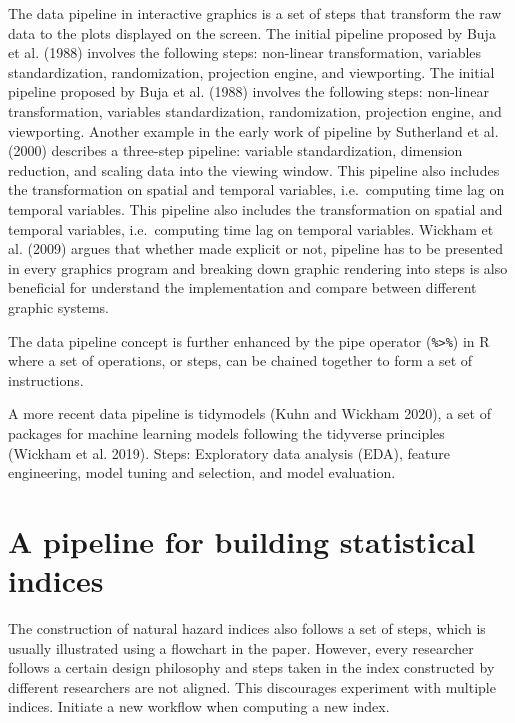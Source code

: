 \documentclass[
]{article}
\begin{document}
The data pipeline in interactive graphics is a set of steps that
transform the raw data to the plots displayed on the screen. The initial
pipeline proposed by Buja et al. (1988) involves the following steps:
non-linear transformation, variables standardization, randomization,
projection engine, and viewporting. The initial pipeline proposed by
Buja et al. (1988) involves the following steps: non-linear
transformation, variables standardization, randomization, projection
engine, and viewporting. Another example in the early work of pipeline
by Sutherland et al. (2000) describes a three-step pipeline: variable
standardization, dimension reduction, and scaling data into the viewing
window. This pipeline also includes the transformation on spatial and
temporal variables, i.e.~computing time lag on temporal variables. This
pipeline also includes the transformation on spatial and temporal
variables, i.e.~computing time lag on temporal variables. Wickham et al.
(2009) argues that whether made explicit or not, pipeline has to be
presented in every graphics program and breaking down graphic rendering
into steps is also beneficial for understand the implementation and
compare between different graphic systems.

The data pipeline concept is further enhanced by the pipe operator
(\texttt{\%\textgreater{}\%}) in R where a set of operations, or steps,
can be chained together to form a set of instructions.

A more recent data pipeline is tidymodels (Kuhn and Wickham 2020), a set
of packages for machine learning models following the tidyverse
principles (Wickham et al. 2019). Steps: Exploratory data analysis
(EDA), feature engineering, model tuning and selection, and model
evaluation.

\hypertarget{sec-a-pipeline-for-building-statistical-indices}{%
\section{A pipeline for building statistical
indices}\label{sec-a-pipeline-for-building-statistical-indices}}

The construction of natural hazard indices also follows a set of steps,
which is usually illustrated using a flowchart in the paper. However,
every researcher follows a certain design philosophy and steps taken in
the index constructed by different researchers are not aligned. This
discourages experiment with multiple indices. Initiate a new workflow
when computing a new index.
\end{document}
